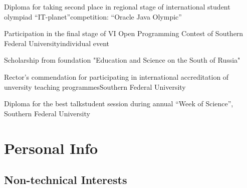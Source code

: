 \documentclass[11pt,a4paper]{moderncv}   %
\newcommand{\MyHrefImpl}[2]{%
\textcolor{blue}{\href{#1}{#2}}}
\def\LINKS{}
\newcommand*{\myhref}[2]{%
\ignorespaces%
\ifdefined\LINKS%
\MyHrefImpl{#1}{#2}%
\else%
#2%
\fi%
}
\begin{document}
      {Diploma for taking second place in regional stage of international student olympiad “IT-planet”}{}{}{competition: “Oracle Java Olympic”}
      {%
      }

      {Participation in the final stage of VI Open Programming Contest of Southern Federal University}{}{}{individual event}
      {%
      }

      {Scholarship from foundation "Education and Science on the South of Russia"}{}{}{}
      {%
      }

      {Rector's commendation for participating in international accreditation of unversity teaching programmes}{Southern Federal University}{}{}
      {%
      }

      {Diploma for the best talk}{student session during annual “Week of Science”, Southern Federal University}{}{}
      {%
    }



\section{Personal Info}



\subsection{Non-technical Interests}
\end{document}
